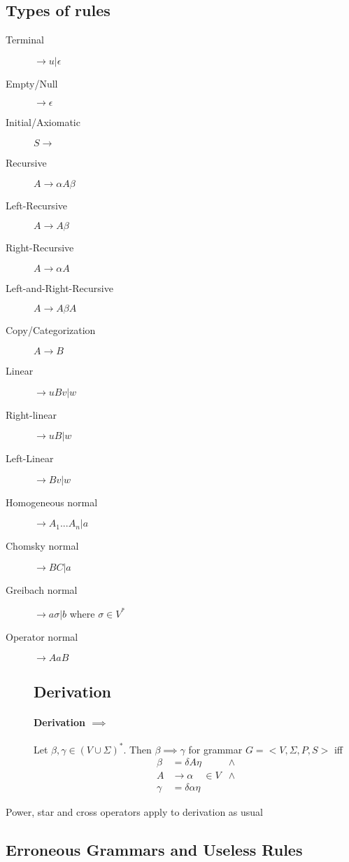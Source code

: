 \documentclass{article}
\begin{document}
\subsection{Types of rules}
\begin{description}
\item[Terminal] $\rightarrow u|\epsilon$
\item[Empty/Null] $\rightarrow \epsilon$
\item[Initial/Axiomatic] $S\rightarrow$
\item[Recursive] $A\rightarrow \alpha A \beta$
\item[Left-Recursive] $A \rightarrow A \beta$
\item[Right-Recursive] $A \rightarrow \alpha A$
\item[Left-and-Right-Recursive] $A \rightarrow A \beta A$
\item[Copy/Categorization] $A \rightarrow B$
\item[Linear] $\rightarrow uBv|w$
\item[Right-linear] $\rightarrow uB|w$
\item[Left-Linear] $\rightarrow Bv|w$
\item[Homogeneous normal] $\rightarrow A_1...A_n|a$
\item[Chomsky normal] $\rightarrow BC|a$
\item[Greibach normal] $\rightarrow a\sigma | b$ where $\sigma \in V^*$
\item[Operator normal] $\rightarrow AaB$
\subsection{Derivation}
\paragraph{Derivation $\implies$} Let $\beta, \gamma \in (V \cup \Sigma)^*$. Then $\beta \implies \gamma$ for grammar $G=<V,\Sigma, P, S>$ iff
\begin{align*}
\beta	&=\delta A \eta	&\wedge\\
A &\rightarrow \alpha \quad \in V &\wedge\\
\gamma &= \delta \alpha \eta
\end{align*}
\end{description}
Power, star and cross operators apply to derivation as usual %
\subsection{Erroneous Grammars and Useless Rules}
\end{document}

